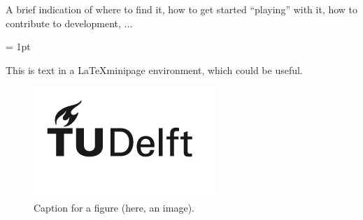 A brief indication of where to find it, how to get started ``playing'' with it, how to contribute to development, ...

\fboxrule = 1pt


\begin{center}
    \begin{minipage}[tc]{30mm}
        This is text in a \LaTeX minipage environment, which could be useful.
    \end{minipage}
\end{center}

\begin{center}
    \begin{figure}[]
                \includegraphics[width=.5\linewidth]{tudelft_logo_black_2022.png}
        \caption[]{Caption for a figure (here, an image).}
    \end{figure}
\end{center}
